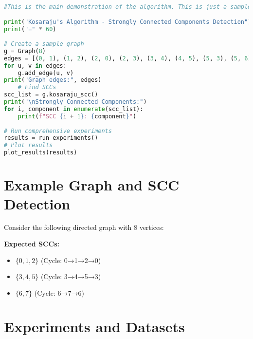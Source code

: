 \documentclass{book}
\theoremstyle{definition}
\begin{document}
\begin{lstlisting}[language=Python, caption=Graph Class Structure]
   
#This is the main demonstration of the algorithm. This is just a sample code for demonstration and the output files of this and some othe sample runs can be found on the github repository.

print("Kosaraju's Algorithm - Strongly Connected Components Detection")
print("=" * 60)
    
# Create a sample graph
g = Graph(8)
edges = [(0, 1), (1, 2), (2, 0), (2, 3), (3, 4), (4, 5), (5, 3), (5, 6), (6, 7), (7, 6)]
for u, v in edges:
    g.add_edge(u, v)
print("Graph edges:", edges)
    # Find SCCs
scc_list = g.kosaraju_scc()
print("\nStrongly Connected Components:")
for i, component in enumerate(scc_list):
    print(f"SCC {i + 1}: {component}")
    
# Run comprehensive experiments
results = run_experiments()
# Plot results
plot_results(results)
\end{lstlisting}

\section{Example Graph and SCC Detection}

Consider the following directed graph with 8 vertices:


\textbf{Expected SCCs:}
\begin{itemize}
    \item $\{0, 1, 2\}$ (Cycle: 0→1→2→0)
    \item $\{3, 4, 5\}$ (Cycle: 3→4→5→3)  
    \item $\{6, 7\}$ (Cycle: 6→7→6)
\end{itemize}



\section{Experiments and Datasets}
\end{document}
